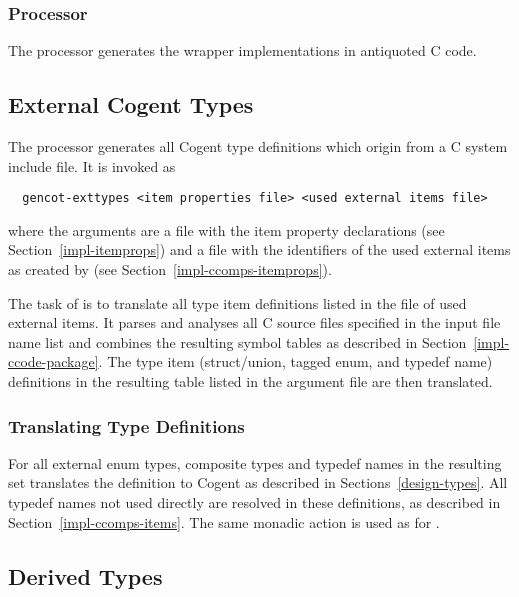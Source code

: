 \subsubsection{Processor }

The processor  generates the wrapper implementations in antiquoted C code.

\subsection{External Cogent Types}
\label{impl-ccomps-exttypes}

The processor  generates all Cogent type definitions which origin from a C system include file.
It is invoked as
\begin{verbatim}
  gencot-exttypes <item properties file> <used external items file>
\end{verbatim}
where the arguments are a file with the item property declarations (see 
Section~\ref{impl-itemprops}) and a file with the identifiers of the used external items as created 
by  (see Section~\ref{impl-ccomps-itemprops}).

The task of  is to translate all type item definitions listed in the 
file of used external items. It parses and analyses
all C source files specified in the input file name list and combines the resulting symbol tables as
described in Section~\ref{impl-ccode-package}. The type item (struct/union, tagged enum, and typedef name) definitions 
in the resulting table listed in the argument file are then translated.

\subsubsection{Translating Type Definitions}

For all external enum types, composite types and typedef names in the resulting set  translates the
definition to Cogent as described in Sections~\ref{design-types}.
All typedef names not used directly are resolved in these definitions, as described in Section~\ref{impl-ccomps-items}.
The same monadic action  is used as for .

\subsection{Derived Types}
\label{impl-ccomps-dvdtypes}

